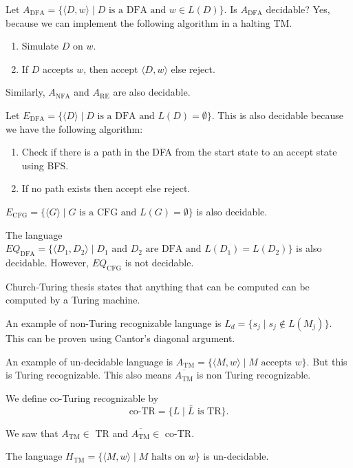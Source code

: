 \documentclass{article}
\begin{document}
Let $A_{\text{DFA}} = \{ \langle D, w \rangle \mid D \text{ is a DFA and } w\in L(D) \}$. Is $A_{\text{DFA}}$ decidable? Yes, because we can implement the following algorithm in a halting TM. 
\begin{enumerate}
\item\label{item:64} Simulate $D$ on $w$. 
\item\label{item:65} If $D$ accepts $w$, then accept $\langle D, w \rangle$ else reject.
\end{enumerate}

Similarly, $A_{\text{NFA}}$ and $A_{\text{RE}}$ are also decidable.

Let $E_{\text{DFA}} = \{ \langle D \rangle \mid D \text{ is a DFA and } L(D)=\emptyset \}$. This is also decidable because we have the following algorithm: 
\begin{enumerate}
\item\label{item:66} Check if there is a path in the DFA from the start state to an accept state using BFS. 
\item\label{item:67} If no path exists then accept else reject.
\end{enumerate}

$E_{\text{CFG}} = \{ \langle G \rangle \mid G \text{ is a CFG and } L(G)=\emptyset \}$ is also decidable.

The language $EQ_{\text{DFA}} = \{ \langle D_1, D_2 \rangle \mid D_1 \text{ and } D_2 \text{ are DFA and } L(D_1) = L(D_2) \}$ is also decidable. However, $EQ_{\text{CFG}}$ is not decidable.

Church-Turing thesis states that anything that can be computed can be computed by a Turing machine.

An example of non-Turing recognizable language is $L_d = \{ s_j \mid s_j \not\in L(M_j) \}$. This can be proven using Cantor's diagonal argument.

An example of un-decidable language is $A_{\text{TM}} = \{ \langle M, w \rangle \mid M \text{ accepts } w \}$. But this is Turing recognizable. This also means $\overline{A_{\text{TM}}}$ is non Turing recognizable.

We define co-Turing recognizable by 
\begin{displaymath}
\text{co-TR} = \{ L \mid \bar{L} \text{ is TR} \}.
\end{displaymath}

We saw that $A_{\text{TM}} \in \text{ TR}$ and $\overline{A_{\text{TM}}} \in $ co-TR.

The language $H_{\text{TM}} = \{ \langle M, w \rangle \mid M \text{ halts on } w\}$ is un-decidable.
\end{document}
